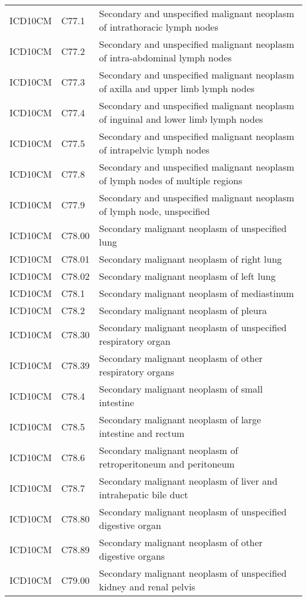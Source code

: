 \begin{longtable}{p{}p{}p{}}
  ICD10CM & C77.1 & Secondary and unspecified malignant neoplasm of intrathoracic lymph nodes \\ 
  ICD10CM & C77.2 & Secondary and unspecified malignant neoplasm of intra-abdominal lymph nodes \\ 
  ICD10CM & C77.3 & Secondary and unspecified malignant neoplasm of axilla and upper limb lymph nodes \\ 
  ICD10CM & C77.4 & Secondary and unspecified malignant neoplasm of inguinal and lower limb lymph nodes \\ 
  ICD10CM & C77.5 & Secondary and unspecified malignant neoplasm of intrapelvic lymph nodes \\ 
  ICD10CM & C77.8 & Secondary and unspecified malignant neoplasm of lymph nodes of multiple regions \\ 
  ICD10CM & C77.9 & Secondary and unspecified malignant neoplasm of lymph node, unspecified \\ 
  ICD10CM & C78.00 & Secondary malignant neoplasm of unspecified lung \\ 
  ICD10CM & C78.01 & Secondary malignant neoplasm of right lung \\ 
  ICD10CM & C78.02 & Secondary malignant neoplasm of left lung \\ 
  ICD10CM & C78.1 & Secondary malignant neoplasm of mediastinum \\ 
  ICD10CM & C78.2 & Secondary malignant neoplasm of pleura \\ 
  ICD10CM & C78.30 & Secondary malignant neoplasm of unspecified respiratory organ \\ 
  ICD10CM & C78.39 & Secondary malignant neoplasm of other respiratory organs \\ 
  ICD10CM & C78.4 & Secondary malignant neoplasm of small intestine \\ 
  ICD10CM & C78.5 & Secondary malignant neoplasm of large intestine and rectum \\ 
  ICD10CM & C78.6 & Secondary malignant neoplasm of retroperitoneum and peritoneum \\ 
  ICD10CM & C78.7 & Secondary malignant neoplasm of liver and intrahepatic bile duct \\ 
  ICD10CM & C78.80 & Secondary malignant neoplasm of unspecified digestive organ \\ 
  ICD10CM & C78.89 & Secondary malignant neoplasm of other digestive organs \\ 
  ICD10CM & C79.00 & Secondary malignant neoplasm of unspecified kidney and renal pelvis \\ 

\end{longtable}
